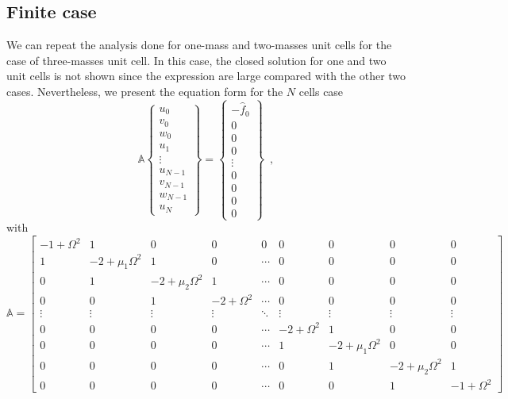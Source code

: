\documentclass[12pt,letterpaper]{article}
\begin{document}
\subsection{Finite case}
We can repeat the analysis done for one-mass and two-masses unit cells for the case of three-masses unit cell. In this case, the closed solution for one and two unit cells is not shown since the expression are large compared with the other two cases. Nevertheless, we present the equation form for the $N$ cells case
\begin{equation}
  \mathbb{A}\begin{Bmatrix}
  u_0 \\ 
  v_0 \\ 
  w_0 \\ 
  u_1 \\ 
  \vdots \\ 
  u_{N-1} \\ 
  v_{N-1} \\ 
  w_{N-1} \\ 
  u_N
  \end{Bmatrix} = 
  \begin{Bmatrix}
  -\hat{f}_0 \\ 
  0 \\ 
  0 \\ 
  0 \\ 
  \vdots \\ 
  0 \\ 
  0 \\ 
  0 \\ 
  0
\end{Bmatrix} \enspace ,
\end{equation}
with
\[\mathbb{A} = \begin{bmatrix}
 -1 + \Omega^2 & 1 & 0 & 0 & 0 & 0 & 0 & 0 & 0 \\ 
 1 & -2 + \mu_1\Omega^2 & 1 & 0 & \cdots & 0 & 0 & 0 & 0 \\ 
 0 & 1 & -2 + \mu_2\Omega^2 & 1 & \cdots & 0 & 0 & 0 & 0 \\ 
 0 & 0 & 1 & -2 + \Omega^2 & \cdots & 0 & 0 & 0 & 0 \\ 
 \vdots & \vdots & \vdots & \vdots & \ddots & \vdots & \vdots & \vdots & \vdots \\ 
 0 & 0 & 0 & 0 & \cdots & -2 + \Omega^2 & 1 & 0 & 0 \\ 
 0 & 0 & 0 & 0 & \cdots & 1 & -2 + \mu_1\Omega^2 & 0 & 0 \\ 
 0 & 0 & 0 & 0 & \cdots & 0 & 1 & -2 + \mu_2\Omega^2 & 1 \\ 
 0 & 0 & 0 & 0 & \cdots & 0 & 0 & 1 & -1 + \Omega^2
 \end{bmatrix}\]
 
\end{document}
